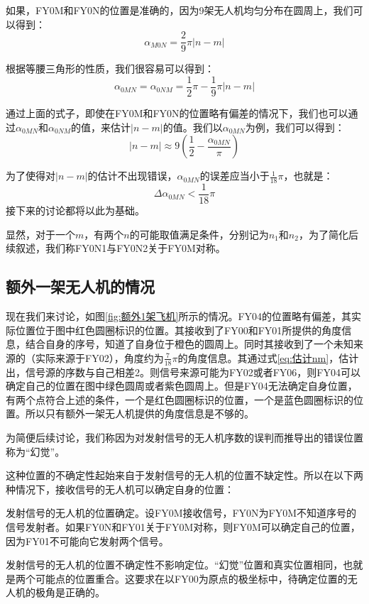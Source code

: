 \documentclass[12pt,AutoFakeSlant,AutoFakeBold]{article}
\begin{document}
如果，FY0M和FY0N的位置是准确的，因为9架无人机均匀分布在圆周上，我们可以得到：
\begin{equation}
    \alpha_{M0N} = \frac{2}{9}\pi\left|n-m\right|
\end{equation}

根据等腰三角形的性质，我们很容易可以得到：
\begin{equation}
    \alpha_{0MN} = \alpha_{0NM} = \frac{1}{2}\pi - \frac{1}{9}\pi\left|n-m\right|
\end{equation}

通过上面的式子，即使在FY0M和FY0N的位置略有偏差的情况下，我们也可以通过$\alpha_{0MN}$和$\alpha_{0NM}$的值，来估计$|n-m|$的值。我们以$\alpha_{0MN}$为例，我们可以得到：
\begin{equation}
    \left|n-m\right| \approx 9\left(\frac{1}{2} - \frac{\alpha_{0MN}}{\pi}\right)
    \label{eq:估计nm}
\end{equation}

为了使得对$\left|n-m\right|$的估计不出现错误，$\alpha_{0MN}$的误差应当小于$\frac{1}{18}\pi$，也就是：
\begin{equation}
    \Delta\alpha_{0MN} < \frac{1}{18}\pi
    \label{eq:误差条件}
\end{equation}
接下来的讨论都将以此为基础。

显然，对于一个$m$，有两个$n$的可能取值满足条件，分别记为$n_1$和$n_2$，为了简化后续叙述，我们称FY0N1与FY0N2关于FY0M对称。

\subsection{额外一架无人机的情况}

现在我们来讨论，如图\ref{fig:额外1架飞机}所示的情况。FY04的位置略有偏差，其实际位置位于图中红色圆圈标识的位置。其接收到了FY00和FY01所提供的角度信息，结合自身的序号，知道了自身位于橙色的圆周上。同时其接收到了一个未知来源的（实际来源于FY02），角度约为$\frac{7}{18}\pi$的角度信息。其通过式\ref{eq:估计nm}，估计出，信号源的序数与自己相差2。则信号来源可能为FY02或者FY06，则FY04可以确定自己的位置在图中绿色圆周或者紫色圆周上。但是FY04无法确定自身位置，有两个点符合上述的条件，一个是红色圆圈标识的位置，一个是蓝色圆圈标识的位置。所以只有额外一架无人机提供的角度信息是不够的。

为简便后续讨论，我们称因为对发射信号的无人机序数的误判而推导出的错误位置称为“幻觉”。

这种位置的不确定性起始来自于发射信号的无人机的位置不缺定性。所以在以下两种情况下，接收信号的无人机可以确定自身的位置：
\begin{itemize*}
    \item 发射信号的无人机的位置确定。设FY0M接收信号，FY0N为FY0M不知道序号的信号发射者。如果FY0N和FY01关于FY0M对称，则FY0M可以确定自己的位置，因为FY01不可能向它发射两个信号。
    \item 发射信号的无人机的位置不确定性不影响定位。“幻觉”位置和真实位置相同，也就是两个可能点的位置重合。这要求在以FY00为原点的极坐标中，待确定位置的无人机的极角是正确的。
\end{itemize*}
\end{document}
